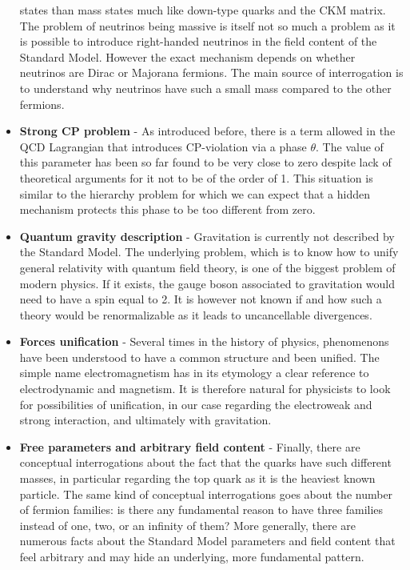\begin{itemize}
            states than mass states much like down-type quarks and the CKM
            matrix. The problem of neutrinos being massive is itself not so much
            a problem as it is possible to introduce right-handed neutrinos in
            the field content of the Standard Model. However the exact mechanism
            depends on whether neutrinos are Dirac or Majorana fermions. The
            main source of interrogation is to understand why neutrinos have
            such a small mass compared to the other fermions.
        \item \textbf{Strong CP problem} - As introduced before, there is a term
            allowed in the QCD Lagrangian that introduces CP-violation via a
            phase $\theta$. The value of this parameter has been so far found to
            be very close to zero despite lack of theoretical arguments for it
            not to be of the order of 1. This situation is similar to the
            hierarchy problem for which we can expect that a hidden mechanism
            protects this phase to be too different from zero.
        \item \textbf{Quantum gravity description} - Gravitation is currently
            not described by the Standard Model. The underlying problem, which
            is to know how to unify general relativity with quantum field
            theory, is one of the biggest problem of modern physics. If it
            exists, the gauge boson associated to gravitation would need to have
            a spin equal to 2. It is however not known if and how such a theory
            would be renormalizable as it leads to uncancellable divergences.
        \item \textbf{Forces unification} - Several times in the history of
            physics, phenomenons have been understood to have a common structure
            and been unified. The simple name electromagnetism has in its
            etymology a clear reference to electrodynamic and magnetism. It is
            therefore natural for physicists to look for possibilities of
            unification, in our case regarding the electroweak and strong
            interaction, and ultimately with gravitation.
        \item \textbf{Free parameters and arbitrary field content} - Finally,
            there are conceptual interrogations about the fact that the quarks
            have such different masses, in particular regarding the top quark as
            it is the heaviest known particle. The same kind of conceptual
            interrogations goes about the number of fermion families: is there
            any fundamental reason to have three families instead of one, two,
            or an infinity of them? More generally, there are numerous facts
            about the Standard Model parameters and field content that feel
            arbitrary and may hide an underlying, more fundamental pattern.
    \end{itemize}


